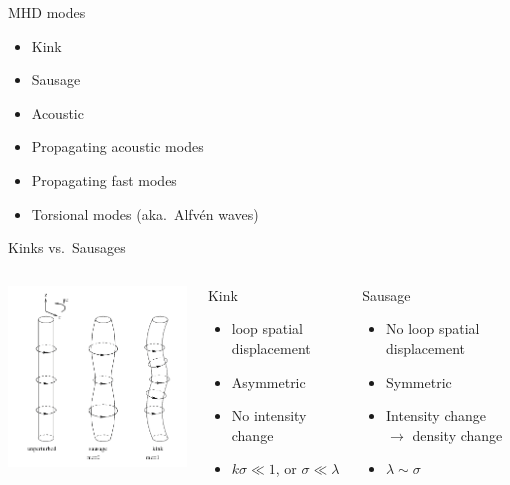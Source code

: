 \documentclass[table]{beamer}
\begin{document}
\begin{frame}{MHD modes}
    \begin{itemize}
        \item Kink
        \item Sausage
        \item Acoustic
        \item Propagating acoustic modes
        \item Propagating fast modes
        \item Torsional modes (aka.\ Alfv\'en waves)
    \end{itemize}
\end{frame}%
\begin{frame}{Kinks vs.\ Sausages}
\begin{columns}
    \includegraphics[width=2.5in]{kink_saus.png}
    \begin{block}{Kink}
        \begin{itemize}
            \item loop spatial displacement
            \item Asymmetric
            \item No intensity change
            \item $k\sigma \ll 1$, or $\sigma\ll\lambda$
        \end{itemize}
    \end{block}
    \begin{block}{Sausage}
        \begin{itemize}
            \item No loop spatial displacement
            \item Symmetric
            \item Intensity change\\ $\rightarrow$ density change
            \item $\lambda\sim\sigma$
        \end{itemize}
    \end{block}
\end{columns}
\end{frame}%
\end{document}
